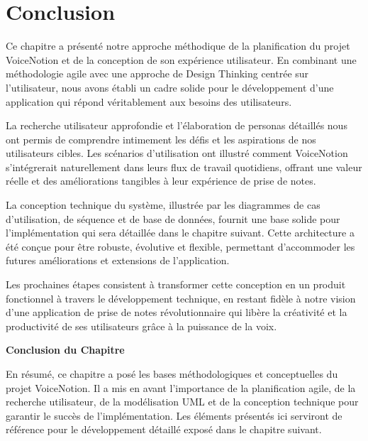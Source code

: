 \section{Conclusion}

Ce chapitre a présenté notre approche méthodique de la planification du projet VoiceNotion et de la conception de son expérience utilisateur. En combinant une méthodologie agile avec une approche de Design Thinking centrée sur l'utilisateur, nous avons établi un cadre solide pour le développement d'une application qui répond véritablement aux besoins des utilisateurs.

La recherche utilisateur approfondie et l'élaboration de personas détaillés nous ont permis de comprendre intimement les défis et les aspirations de nos utilisateurs cibles. Les scénarios d'utilisation ont illustré comment VoiceNotion s'intégrerait naturellement dans leurs flux de travail quotidiens, offrant une valeur réelle et des améliorations tangibles à leur expérience de prise de notes.

La conception technique du système, illustrée par les diagrammes de cas d'utilisation, de séquence et de base de données, fournit une base solide pour l'implémentation qui sera détaillée dans le chapitre suivant. Cette architecture a été conçue pour être robuste, évolutive et flexible, permettant d'accommoder les futures améliorations et extensions de l'application.

Les prochaines étapes consistent à transformer cette conception en un produit fonctionnel à travers le développement technique, en restant fidèle à notre vision d'une application de prise de notes révolutionnaire qui libère la créativité et la productivité de ses utilisateurs grâce à la puissance de la voix. 

\vspace{1cm}
\begin{center}
\textbf{\large Conclusion du Chapitre}
\end{center}

\noindent
En résumé, ce chapitre a posé les bases méthodologiques et conceptuelles du projet VoiceNotion. Il a mis en avant l'importance de la planification agile, de la recherche utilisateur, de la modélisation UML et de la conception technique pour garantir le succès de l'implémentation. Les éléments présentés ici serviront de référence pour le développement détaillé exposé dans le chapitre suivant.

